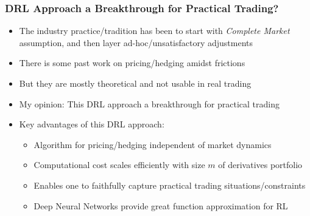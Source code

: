 \documentclass{beamer}
\begin{document}
\begin{frame}
\frametitle{DRL Approach a Breakthrough for Practical Trading?}
\begin{itemize}
\item The industry practice/tradition has been to start with {\em Complete Market} assumption, and then layer ad-hoc/unsatisfactory adjustments
\item There is some past work on pricing/hedging amidst frictions
\item But they are mostly theoretical and not usable in real trading
\item My opinion: This DRL approach a breakthrough for practical trading
\item Key advantages of this DRL approach:
\begin{itemize}
\item Algorithm for pricing/hedging independent of market dynamics
\item Computational cost scales efficiently with size $m$ of derivatives portfolio
\item Enables one to faithfully capture practical trading situations/constraints
\item Deep Neural Networks provide great function approximation for RL 
\end{itemize}
\end{itemize}

\end{frame}
\end{document}
